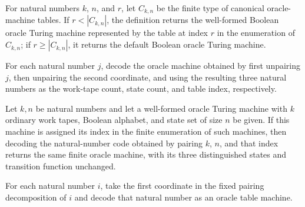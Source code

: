 \begin{definition}
\label{Complexity.oracleTableAt}
\leanok
{}
For natural numbers $k$, $n$, and $r$, let $C_{k,n}$ be the finite type of canonical
oracle-machine tables. If $r<|C_{k,n}|$, the definition returns the well-formed Boolean
oracle Turing machine represented by the table at index $r$ in the enumeration of
$C_{k,n}$; if $r\ge |C_{k,n}|$, it returns the default Boolean oracle Turing machine.
\end{definition}

\begin{definition}
\label{Complexity.decodeOracleTable}
\leanok
{}
For each natural number $j$, decode the oracle machine obtained by first unpairing $j$,
then unpairing the second coordinate, and using the resulting three natural numbers as
the work-tape count, state count, and table index, respectively.
\end{definition}

\begin{theorem}
\label{Complexity.decodeOracleTable_rank}
\leanok
{}
Let $k,n$ be natural numbers and let a well-formed oracle Turing machine with $k$
ordinary work tapes, Boolean alphabet, and state set of size $n$ be given. If this
machine is assigned its index in the finite enumeration of such machines, then decoding
the natural-number code obtained by pairing $k$, $n$, and that index returns the same
finite oracle machine, with its three distinguished states and transition function
unchanged.
\end{theorem}

\begin{definition}
\label{Complexity.oracleEnumeration}
\leanok
{}
For each natural number $i$, take the first coordinate in the fixed pairing
decomposition of $i$ and decode that natural number as an oracle table machine.
\end{definition}

